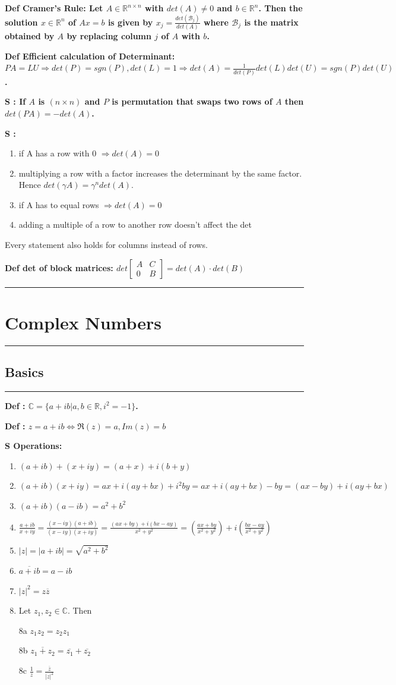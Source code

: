 \documentclass[7pt,landscape, margin = 0.1mm]{article}
\newcommand{\titellinie}{\rule{1.\linewidth}{0.75pt}}
\newcommand*{\mysection}[2][black]{\vskip 0pt \titellinie\vspace{-20pt}\section{#2}\vspace{-14pt}\titellinie \colorlet{chaptercolor}{#1}}
\newcommand*{\mysubsection}[1]{\vspace{-2mm}\color{chaptercolor}\subsection{ #1 }
\vspace{-1mm}\hrule\vspace{1.5mm}\color{black}
\vspace{2mm}}
\newcommand{\DEF}[2]{\color{chaptercolor}\bf{Def #1}:\color{black}    \hspace{0.2cm} #2}
\newcommand{\SA}[2]{\color{chaptercolor}\bf{S #1}:\color{black}    \hspace{0.2cm} #2}
\begin{document}
\begin{multicols}{4}
\begin{flushleft}
{\DEF{Cramer's Rule}{Let $A\in\mathbb{R}^{n\times n}$ with $det(A)\neq0$ and $b\in\mathbb{R}^n$. Then the solution $x\in\mathbb{R}^n$ of $Ax=b$ is given by $x_j=\frac{det(\mathscr{B}_j)}{det(A)}$ where $\mathscr{B}_j$ is the matrix obtained by $A$ by replacing column $j$ of $A$ with $b$.}

\DEF{Efficient calculation of Determinant}{$PA=LU \Rightarrow det(P)=sgn(P), det(L)=1 \Rightarrow det(A)=\frac{1}{det(P)}det(L)det(U)=sgn(P)det(U)$.}

\SA{}{If $A$ is $(n\times n)$ and $P$ is permutation that swaps two rows of $A$ then $det(PA)=-det(A)$.}


\SA{}{\begin{enumerate}[nolistsep]
\item if A has a row with 0 $\Rightarrow det(A)=0$
\item multiplying a row with a factor increases the determinant by the same factor. Hence $det(\gamma A) = \gamma^n det(A)$.
\item if A has to equal rows  $\Rightarrow det(A)=0$
\item adding a multiple of a row to another row doesn't affect the det
\end{enumerate}
Every statement also holds for columns instead of rows.}

\DEF{det of block matrices}{$det \left[ 
\begin{array}{c|c} 
  A & C \\ 
  \hline 
  0 & B
\end{array} 
\right]  = det (A)\cdot det(B)$}




\mysection[BrickRed]{\centering Complex Numbers}
\mysubsection{Basics}
\DEF{}{$\mathbb{C}=\{a+ib|a,b\in\mathbb{R}, i^2=-1\}$.}

\DEF{}{$z = a + ib \Leftrightarrow \Re (z)=a, Im(z)=b $}

\SA{Operations}{\begin{enumerate}[nolistsep]
    \item $(a+ib)+(x+iy)=(a+x)+i(b+y)$
    \item $(a+ib)(x+iy)=ax+i(ay+bx)+i^2by=ax+i(ay+bx)-by=(ax-by)+i(ay+bx)$
    \item $(a+ib)(a-ib)=a^2+b^2$
    \item $\frac{a+ib}{x+iy}=\frac{(x-iy)(a+ib)}{(x-iy)(x+iy)}=\frac{(ax+by)+i(bx-ay)}{x^2+y^2}=(\frac{ax+by}{x^2+y^2})+i(\frac{bx-ay}{x^2+y^2})$
    \item $|z|=|a+ib|=\sqrt{a^2+b^2}$
    \item $\overline{a+ib}=a-ib$
    \item $|z|^2=z\overline{z}$
    \item Let $z_1,z_2\in\mathbb{C}$. Then
    \item[8a] $z_1z_2=z_2z_1$
    \item[8b] $\overline{z_1+z_2}=\overline{z_1}+\overline{z_2}$
    \item[8c] $\frac{1}{z}=\frac{\overline{z}}{|z|^2}$
\end{enumerate}}

}
\end{flushleft}
\end{multicols}
\end{document}
